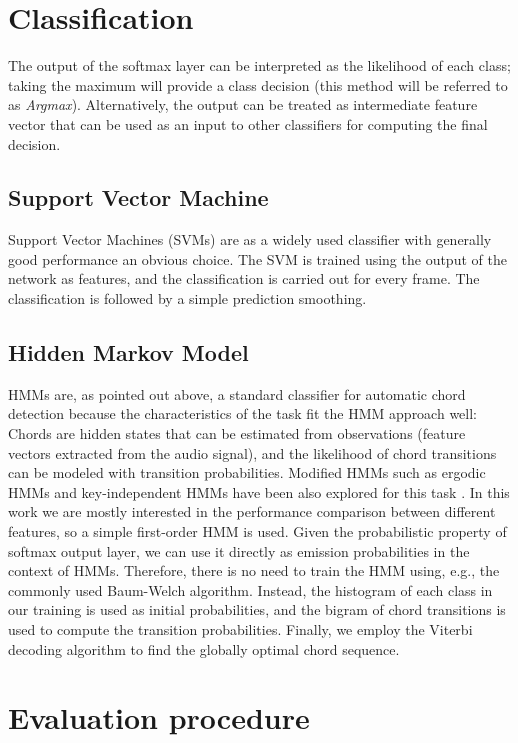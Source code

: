 \documentclass{article}
\begin{document}
\section{Classification}\label{sec:class}
The output of the softmax layer can be interpreted as the likelihood of each class; taking the maximum will provide a class decision (this method will be referred to as \textit{Argmax}). Alternatively, the output can be treated as intermediate feature vector that can be used as an input to other classifiers for computing the final decision. 
\subsection{Support Vector Machine}
Support Vector Machines (SVMs) are as a widely used classifier with generally good performance an obvious choice. The SVM is trained using the output of the network as features, and the classification is carried out for every frame. The classification is followed by a simple prediction smoothing.
\subsection{Hidden Markov Model}
HMMs are, as pointed out above, a standard classifier for automatic chord detection because the characteristics of the task fit the HMM approach well: Chords are hidden states that can be estimated from observations (feature vectors extracted from the audio signal), and the likelihood of chord transitions can be modeled with transition probabilities. 
Modified HMMs such as ergodic HMMs and key-independent HMMs have been also explored for this task \cite{papadopoulos2007large,lee2008acoustic}. In this work we are mostly interested in the performance comparison between different features, so a simple first-order HMM is used. 
Given the probabilistic property of softmax output layer, we can use it directly as emission probabilities in the context of HMMs. Therefore, there is no need to train the HMM using, e.g., the commonly used Baum-Welch algorithm. Instead, the histogram of each class in our training is used as initial probabilities, and the bigram of chord transitions is used to compute the transition probabilities. Finally, we employ the Viterbi decoding algorithm to find the globally optimal chord sequence. 

\section{Evaluation procedure}
\end{document}
